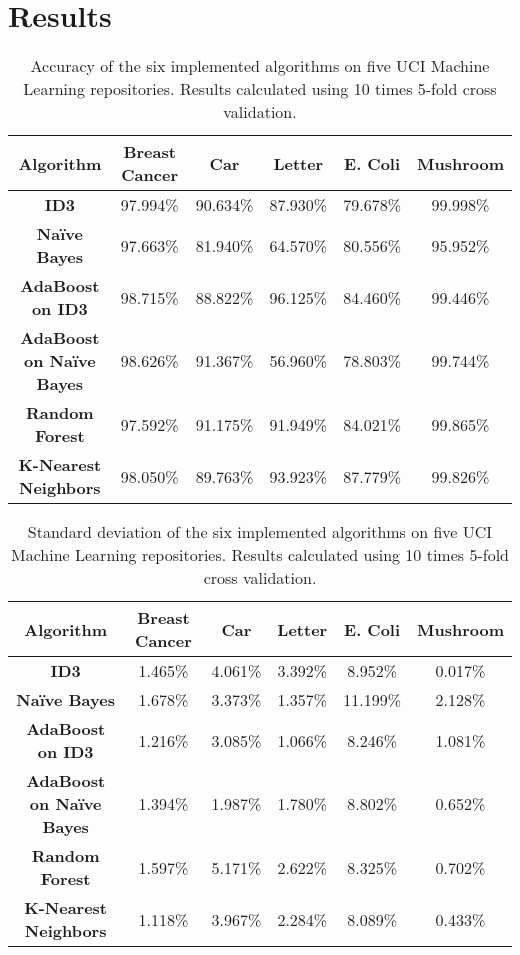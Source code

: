 \documentclass[11pt]{article}
\newcommand{\bb}{\textbf}
\begin{document}
\section{Results}
\begin{table}
  \begin{tabular}{ |c|c|c|c|c|c| }
    \hline
    \bb{Algorithm}               & \bb{Breast Cancer} & \bb{Car} & \bb{Letter} & \bb{E. Coli}  & \bb{Mushroom} \\ \hline
    \bb{ID3}                     & 97.994\%           & 90.634\% & 87.930\%    & 79.678\%      & 99.998\%      \\ \hline
    \bb{Naïve Bayes}             & 97.663\%           & 81.940\% & 64.570\%    & 80.556\%      & 95.952\%      \\ \hline
    \bb{AdaBoost on ID3}         & 98.715\%           & 88.822\% & 96.125\%    & 84.460\%      & 99.446\%      \\ \hline
    \bb{AdaBoost on Naïve Bayes} & 98.626\%           & 91.367\% & 56.960\%    & 78.803\%      & 99.744\%      \\ \hline
    \bb{Random Forest}           & 97.592\%           & 91.175\% & 91.949\%    & 84.021\%      & 99.865\%      \\ \hline
    \bb{K-Nearest Neighbors}     & 98.050\%           & 89.763\% & 93.923\%    & 87.779\%      & 99.826\%      \\ \hline
  \end{tabular}
  \caption{Accuracy of the six implemented algorithms on five UCI Machine Learning repositories. Results calculated using 10 times 5-fold cross validation.}
  \label{table:accuracies}
\end{table}

\begin{table}
  \begin{tabular}{ |c|c|c|c|c|c| }
    \hline
    \bb{Algorithm}               & \bb{Breast Cancer} & \bb{Car} & \bb{Letter} & \bb{E. Coli}  & \bb{Mushroom} \\ \hline
    \bb{ID3}                     & 1.465\%            & 4.061\%  & 3.392\%     & 8.952\%       & 0.017\%       \\ \hline
    \bb{Naïve Bayes}             & 1.678\%            & 3.373\%  & 1.357\%     & 11.199\%      & 2.128\%       \\ \hline
    \bb{AdaBoost on ID3}         & 1.216\%            & 3.085\%  & 1.066\%     & 8.246\%       & 1.081\%       \\ \hline
    \bb{AdaBoost on Naïve Bayes} & 1.394\%            & 1.987\%  & 1.780\%     & 8.802\%       & 0.652\%       \\ \hline
    \bb{Random Forest}           & 1.597\%            & 5.171\%  & 2.622\%     & 8.325\%       & 0.702\%       \\ \hline
    \bb{K-Nearest Neighbors}     & 1.118\%            & 3.967\%  & 2.284\%     & 8.089\%       & 0.433\%       \\ \hline
  \end{tabular}
  \caption{Standard deviation of the six implemented algorithms on five UCI Machine Learning repositories. Results calculated using 10 times 5-fold cross validation.}
\end{table}
\end{document}
